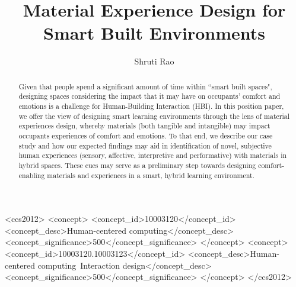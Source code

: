 \documentclass[manuscript, anonymous, review]{acmart}
\begin{document}
\title{Material Experience Design for Smart Built Environments}

\author{Shruti Rao}



\renewcommand{\shortauthors}{Rao et al.}

\begin{abstract}
Given that people spend a significant amount of time within ``smart built spaces", designing spaces considering the impact that it may have on occupants’ comfort and emotions is a challenge for Human-Building Interaction (HBI). In this position paper, we offer the view of designing smart learning environments through the lens of material experiences design, whereby materials (both tangible and intangible) may impact occupants experiences of comfort and emotions. To that end, we describe our case study and how our expected findings may aid in identification of novel, subjective human experiences (sensory, affective, interpretive and performative) with materials in hybrid spaces. These cues may serve as a preliminary step towards designing comfort-enabling materials  and experiences in a smart, hybrid learning environment. 
\end{abstract}


\begin{CCSXML}
<ccs2012>
   <concept>
       <concept_id>10003120</concept_id>
       <concept_desc>Human-centered computing</concept_desc>
       <concept_significance>500</concept_significance>
       </concept>
   <concept>
       <concept_id>10003120.10003123</concept_id>
       <concept_desc>Human-centered computing~Interaction design</concept_desc>
       <concept_significance>500</concept_significance>
       </concept>
 </ccs2012>
\end{CCSXML}
\end{document}
